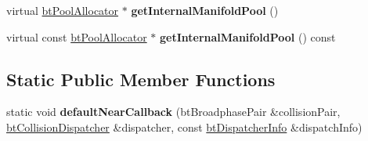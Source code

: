\begin{DoxyCompactItemize}
\item 
\hypertarget{classbt_collision_dispatcher_ad83aab17348866b388615d602ea8be55}{virtual \hyperlink{classbt_pool_allocator}{bt\+Pool\+Allocator} $\ast$ {\bfseries get\+Internal\+Manifold\+Pool} ()}\label{classbt_collision_dispatcher_ad83aab17348866b388615d602ea8be55}

\item 
\hypertarget{classbt_collision_dispatcher_aecf28d66dd133c92d85548c9c11e51b9}{virtual const \hyperlink{classbt_pool_allocator}{bt\+Pool\+Allocator} $\ast$ {\bfseries get\+Internal\+Manifold\+Pool} () const }\label{classbt_collision_dispatcher_aecf28d66dd133c92d85548c9c11e51b9}

\end{DoxyCompactItemize}
\subsection*{Static Public Member Functions}
\begin{DoxyCompactItemize}
\item 
\hypertarget{classbt_collision_dispatcher_a70f1edf7c1f94778d350e6d19b66fa94}{static void {\bfseries default\+Near\+Callback} (bt\+Broadphase\+Pair \&collision\+Pair, \hyperlink{classbt_collision_dispatcher}{bt\+Collision\+Dispatcher} \&dispatcher, const \hyperlink{structbt_dispatcher_info}{bt\+Dispatcher\+Info} \&dispatch\+Info)}\label{classbt_collision_dispatcher_a70f1edf7c1f94778d350e6d19b66fa94}

\end{DoxyCompactItemize}
